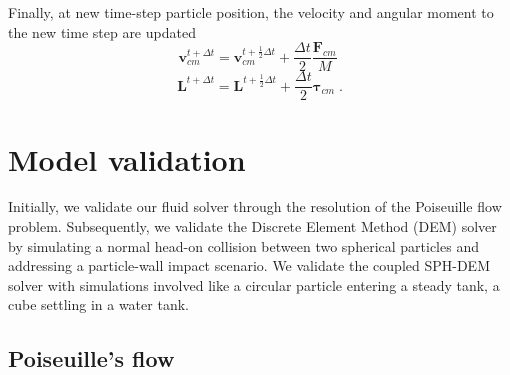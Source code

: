 \documentclass[preprint,12pt]{elsarticle}
\newcommand{\teng}[1]{\ensuremath{\boldsymbol{#1}}}
\newcommand{\ten}[1]{\ensuremath{\mathbf{#1}}}
\begin{document}
Finally, at new time-step particle position, the velocity and angular moment
to the new time step are updated
\begin{equation}
  \label{eq:rfc:lin_vel_cm_update}
  \ten{v}_{cm}^{t+\Delta t} = \ten{v}_{cm}^{t+\frac{1}{2} \Delta t} + \frac{\Delta t}{2} \frac{\ten{F}_{cm}}{M} \;
\end{equation}
\begin{equation}
  \label{eq:rfc:ang_mom_update}
  \ten{L}^{t+\Delta t} = \ten{L}^{t+\frac{1}{2} \Delta t} + \frac{\Delta t}{2} \teng{\tau}_{cm} \;.
\end{equation}


\FloatBarrier%
\section{Model validation}
\label{sec:validation}
Initially, we validate our fluid solver through the resolution of the
Poiseuille flow problem. Subsequently, we validate the Discrete Element Method
(DEM) solver by simulating a normal head-on collision between two spherical
particles and addressing a particle-wall impact scenario.  We validate the
coupled SPH-DEM solver with simulations involved like a circular particle
entering a steady tank, a cube settling in a water tank.

\FloatBarrier%
\subsection{Poiseuille's flow}
\label{sec:poiseuille_flow}
\end{document}
